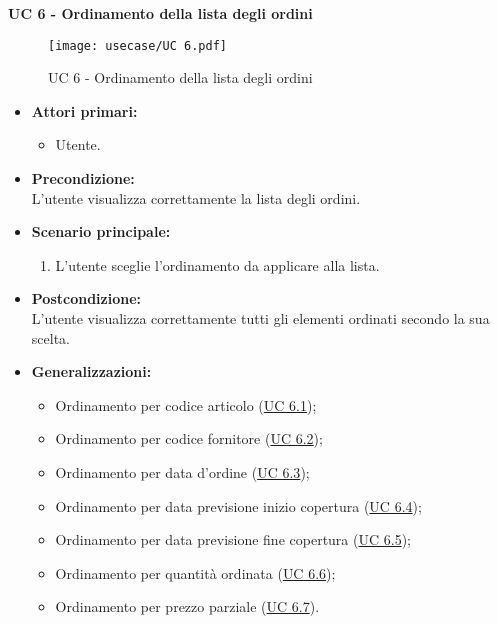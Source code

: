 \vspace{0.4cm}

\newpage

\noindent \textbf{\large UC 6 - Ordinamento della lista degli ordini}
\label{uc:ordinamento-elementi-lista}
\begin{figure}[!h] 
    \centering 
    \texttt{[image: usecase/UC 6.pdf]} 
    \caption{UC 6 - Ordinamento della lista degli ordini}
\end{figure}
\begin{itemize}

	\item \textbf{Attori primari: }
		\begin{itemize}
			\item Utente.
		\end{itemize}

	\item \textbf{Precondizione: }\\[0.3cm]
		L'utente visualizza correttamente la lista degli ordini.

	\item \textbf{Scenario principale: }
		\begin{enumerate}
			\item L'utente sceglie l'ordinamento da applicare alla lista.
		\end{enumerate}
		

	\item \textbf{Postcondizione: }\\[0.3cm]
		L'utente visualizza correttamente tutti gli elementi ordinati secondo la sua scelta.
    
    \item \textbf{Generalizzazioni: }
        \begin{itemize}
            \item Ordinamento per codice articolo (\hyperref[uc:ordinamento-codice-articolo]{UC 6.1});
            \item Ordinamento per codice fornitore (\hyperref[uc:ordinamento-codice-fornitore]{UC 6.2});
            \item Ordinamento per data d'ordine (\hyperref[uc:ordinamento-data-ordine]{UC 6.3});
            \item Ordinamento per data previsione inizio copertura (\hyperref[uc:ordinamento-data-iniziale-copertura]{UC 6.4});
            \item Ordinamento per data previsione fine copertura (\hyperref[uc:ordinamento-data-finale-copertura]{UC 6.5});
            \item Ordinamento per quantità ordinata (\hyperref[uc:ordinamento-quantita-ordinata]{UC 6.6});
            \item Ordinamento per prezzo parziale (\hyperref[uc:ordinamento-prezzo-parziale-ord]{UC 6.7}).
        \end{itemize}
\end{itemize}

